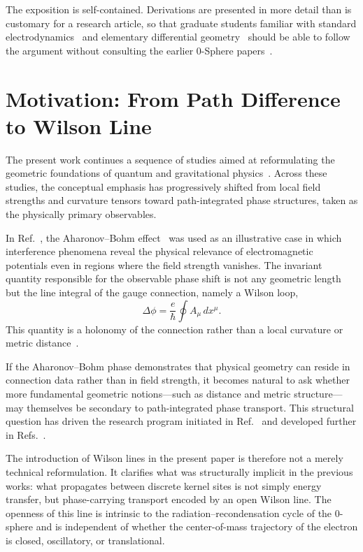 \documentclass[%
 reprint, amsmath,amssymb, aps, prb, ]{revtex4-2}
\numberwithin{equation}{section}
\begin{document}
The exposition is self-contained. Derivations are presented in more detail than is customary for a research article, so that graduate students familiar with standard electrodynamics~\cite{Jackson1998} and elementary differential geometry~\cite{Nakahara2003} should be able to follow the argument without consulting the earlier 0-Sphere papers~\cite{hanamura01,hanamura29,hanamura30,hanamura31}.

\section{Motivation: From Path Difference to Wilson Line}
\label{sec:motivation}

The present work continues a sequence of studies aimed at reformulating the geometric foundations of quantum and gravitational physics~\cite{hanamura01,hanamura29,hanamura30,hanamura31}. Across these studies, the conceptual emphasis has progressively shifted from local field strengths and curvature tensors toward path-integrated phase structures, taken as the physically primary observables.

In Ref.~\cite{hanamura31}, the Aharonov--Bohm effect~\cite{Aharonov1959} was used as an illustrative case in which interference phenomena reveal the physical relevance of electromagnetic potentials even in regions where the field strength vanishes. The invariant quantity responsible for the observable phase shift is not any geometric length but the line integral of the gauge connection, namely a Wilson loop,
\begin{equation}
\Delta\phi = \frac{e}{\hbar}\oint A_\mu\,dx^\mu.
\label{eq:AB_loop}
\end{equation}
This quantity is a holonomy of the connection rather than a local curvature or metric distance~\cite{WuYang1975,Nakahara2003}.

If the Aharonov--Bohm phase demonstrates that physical geometry can reside in connection data rather than in field strength, it becomes natural to ask whether more fundamental geometric notions---such as distance and metric structure---may themselves be secondary to path-integrated phase transport. This structural question has driven the research program initiated in Ref.~\cite{hanamura01} and developed further in Refs.~\cite{hanamura29,hanamura30}.

The introduction of Wilson lines in the present paper is therefore not a merely technical reformulation. It clarifies what was structurally implicit in the previous works: what propagates between discrete kernel sites is not simply energy transfer, but phase-carrying transport encoded by an open Wilson line. The openness of this line is intrinsic to the radiation--recondensation cycle of the 0-sphere and is independent of whether the center-of-mass trajectory of the electron is closed, oscillatory, or translational.
\end{document}

